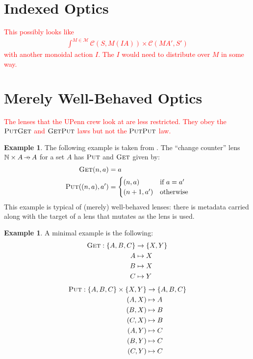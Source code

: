 \documentclass[11pt,a4paper]{article}
\theoremstyle{plain}
\theoremstyle{definition}
\newtheorem{example}[theorem]{Example}
\newcommand{\C}{\mathscr{C}}
\newcommand{\M}{\mathscr{M}}
\newcommand{\bN}{\mathbb{N}}
\newcommand{\fget}{\textsc{Get}}
\newcommand{\fput}{\textsc{Put}}
\newcommand{\hto}{\ensuremath{\,\mathaccent\shortmid\rightarrow\,}}
\newcommand{\todo}[1]{\textcolor{red}{\small #1}}
\begin{document}
\section{Indexed Optics}
\todo{
This possibly looks like
\begin{align*}
\int^{M \in \M} \C(S, M(IA)) \times \C(M A', S')
\end{align*}
with another monoidal action $I$. The $I$ would need to distribute over $M$ in some way.
}
\section{Merely Well-Behaved Optics}
\todo{
The lenses that the UPenn crew look at are less restricted. They obey the $\fput\fget$ and $\fget\fput$ laws but not the $\fput\fput$ law. 
}

\begin{example}
The following example is taken from \cite{AClearPictureOfLensLaws}. The ``change counter'' lens $\bN \times A \hto A$ for a set $A$ has $\fput$ and $\fget$ given by:
\begin{align*}
\fget(n, a) &= a \\
\fput((n, a), a') &= \begin{cases}
(n, a) & \text{if } a = a' \\
(n+1, a') & \text{otherwise}
\end{cases}
\end{align*}
This example is typical of (merely) well-behaved lenses: there is metadata carried along with the target of a lens that mutates as the lens is used.
\end{example}

\begin{example}
A minimal example is the following:
\begin{align*}
\fget : \{A,B,C\} &\to \{X, Y\} \\
A &\mapsto X \\
B &\mapsto X \\
C &\mapsto Y 
\end{align*}
\begin{align*}
\fput : \{A,B,C\} \times \{X, Y\} &\to \{A,B,C\} \\
(A,X) &\mapsto A \\
(B,X) &\mapsto B \\
(C,X) &\mapsto B \\
(A,Y) &\mapsto C \\
(B,Y) &\mapsto C \\
(C,Y) &\mapsto C
\end{align*}
\end{example}
\end{document}

